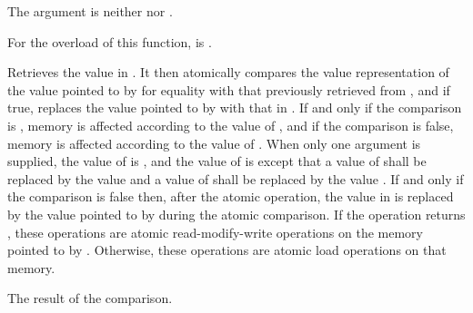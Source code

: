 \begin{itemdescr}
\pnum
\expects
The  argument is neither  nor
.

\pnum
\constraints
For the  overload of this function,
 is .

\pnum
\effects
Retrieves the value in . It then atomically
compares the value representation of the value pointed to by 
for equality with that previously retrieved from ,
and if true, replaces the value pointed to
by  with that in .
If and only if the comparison is , memory is affected according to the
value of , and if the comparison is false, memory is affected according
to the value of . When only one  argument is
supplied, the value of  is , and the value of
 is  except that a value of 
shall be replaced by the value  and a value of
 shall be replaced by the value
.
If and only if the comparison is false then, after the atomic operation,
the value in  is replaced by the value
pointed to by  during the atomic comparison.
If the operation returns , these
operations are atomic read-modify-write
operations on the memory
pointed to by .
Otherwise, these operations are atomic load operations on that memory.

\pnum
\returns
The result of the comparison.


\end{itemdescr}
